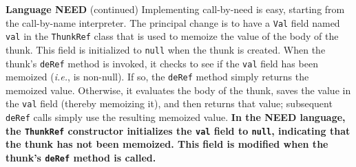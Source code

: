 \begin{minipage}[t]{\sw}
\slidenumber
\LARGE
{\bf Language NEED} (continued)\exx
Implementing call-by-need is easy, starting
from the call-by-name interpreter.
The principal change is to have a \verb'Val' field named \verb'val'
in the \verb'ThunkRef' class
that is used to memoize the value of the body of the thunk.
This field is initialized to \verb'null' when the thunk is created.
When the thunk's \verb'deRef' method is invoked,
it checks to see if the \verb'val' field has been memoized
({\em i.e.}, is non-null).
If so, the \verb'deRef' method simply returns the memoized value.
Otherwise, it evaluates the body of the thunk,
saves the value in the \verb'val' field (thereby memoizing it),
and then returns that value;
subsequent \verb'deRef' calls simply use the resulting memoized value.\exx
{\bf In the NEED language,
the \verb'ThunkRef' constructor initializes
the \verb'val' field to \verb'null',
indicating that the thunk has not been memoized.
This field is modified when the thunk's \verb'deRef' method is called.}
\end{minipage}
\clearpage

